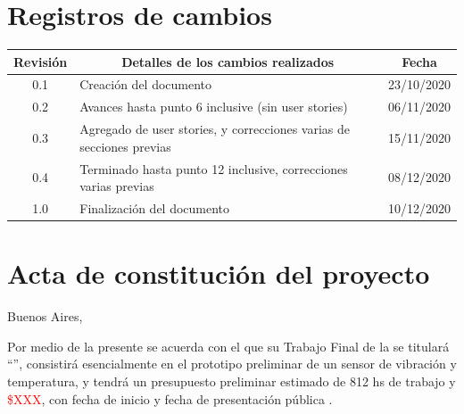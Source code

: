 \documentclass[11pt]{charter}
\begin{document}
\maketitle
\thispagestyle{empty}
\pagebreak


\thispagestyle{empty}
{\setlength{\parskip}{0pt}
\tableofcontents{}
}
\pagebreak


\section{Registros de cambios}
\label{sec:registro}


\begin{table}[ht]
\label{tab:registro}
\centering
\begin{tabularx}{\linewidth}{@{}|c|X|c|@{}}
\hline
\rowcolor[HTML]{C0C0C0} 
Revisión & \multicolumn{1}{c|}{\cellcolor[HTML]{C0C0C0}Detalles de los cambios realizados} & Fecha      \\ \hline
0.1 & Creación del documento & 23/10/2020 \\ \hline
0.2 & Avances hasta punto 6 inclusive (sin user stories) & 06/11/2020 \\ \hline
0.3 & Agregado de user stories, y correcciones varias de secciones previas & 15/11/2020 \\ \hline
0.4      & Terminado hasta punto 12 inclusive, correcciones varias previas & 08/12/2020 \\ \hline
1.0      & Finalización del documento & 10/12/2020 \\ \hline
\end{tabularx}
\end{table}

\pagebreak



\section{Acta de constitución del proyecto}
\label{sec:acta}

\begin{flushright}
Buenos Aires, \fechaInicioName
\end{flushright}

\vspace{2cm}

Por medio de la presente se acuerda con el \authorname\hspace{1px} que su Trabajo Final de la \degreename\hspace{1px} se titulará ``\ttitle'', consistirá esencialmente en el prototipo preliminar de un sensor de vibración y temperatura, y tendrá un presupuesto preliminar estimado de 812 hs de trabajo y \textcolor{red}{\$XXX}, con fecha de inicio \fechaInicioName\hspace{1px} y fecha de presentación pública \fechaFinalName.
\end{document}
